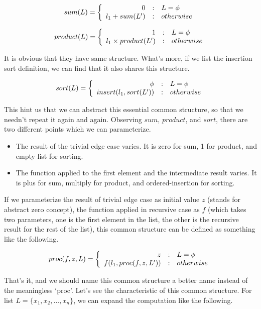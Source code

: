 \documentclass[UTF8]{article}
\begin{document}
\[
sum(L) =  \left \{
  \begin{array}
  {r@{\quad:\quad}l}
  0 & L = \phi \\
  l_1 + sum(L') & otherwise
  \end{array}
\right.
\]

\[
product(L) = \left \{
  \begin{array}
  {r@{\quad:\quad}l}
  1 & L = \phi \\
  l_1 \times product(L') & otherwise
  \end{array}
\right.
\]

It is obvious that they have same structure. What's more, if we list the insertion sort definition, we can
find that it also shares this structure.

\[
sort(L) = \left \{
  \begin{array}
  {r@{\quad:\quad}l}
  \phi & L = \phi \\
  insert(l_1, sort(L')) & otherwise
  \end{array}
\right.
\]

This hint us that we can abstract this essential common structure, so that we needn't repeat it again and again.
Observing $sum$, $product$, and $sort$, there are two different points which we can parameterize.

\begin{itemize}
\item The result of the trivial edge case varies. It is zero for sum, 1 for product, and empty list for sorting.
\item The function applied to the first element and the intermediate result varies. It is plus for sum, multiply for product,
and ordered-insertion for sorting.
\end{itemize}

If we parameterize the result of trivial edge case as initial value $z$ (stands for abstract zero concept), the
function applied in recursive case as $f$ (which takes two parameters, one is the first element in the list,
the other is the recursive result for the rest of the list), this common structure can be defined as something
like the following.

\[
proc(f, z, L) = \left \{
  \begin{array}
  {r@{\quad:\quad}l}
  z & L = \phi \\
  f(l_1, proc(f, z, L')) & otherwise
  \end{array}
\right.
\]

That's it, and we should name this common structure a better name instead of the meaningless `proc'. Let's
see the characteristic of this common structure. For list $L = \{x_1, x_2, ..., x_n \}$, we can expand the
computation like the following.
\end{document}
